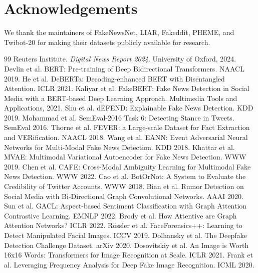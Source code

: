 \documentclass[11pt,a4paper]{article}
\begin{document}
\section*{Acknowledgements}
We thank the maintainers of FakeNewsNet, LIAR, Fakeddit, PHEME, and
Twibot-20 for making their datasets publicly available for research.




\begin{thebibliography}{99}
 Reuters Institute. \textit{Digital News Report 2024}. University of Oxford, 2024.
 Devlin et al. BERT: Pre-training of Deep Bidirectional Transformers. NAACL 2019.
 He et al. DeBERTa: Decoding-enhanced BERT with Disentangled Attention. ICLR 2021.
 Kaliyar et al. FakeBERT: Fake News Detection in Social Media with a BERT-based Deep Learning Approach. Multimedia Tools and Applications, 2021.
 Shu et al. dEFEND: Explainable Fake News Detection. KDD 2019.
 Mohammad et al. SemEval-2016 Task 6: Detecting Stance in Tweets. SemEval 2016.
 Thorne et al. FEVER: a Large-scale Dataset for Fact Extraction and VERification. NAACL 2018.
 Wang et al. EANN: Event Adversarial Neural Networks for Multi-Modal Fake News Detection. KDD 2018.
 Khattar et al. MVAE: Multimodal Variational Autoencoder for Fake News Detection. WWW 2019.
 Chen et al. CAFE: Cross-Modal Ambiguity Learning for Multimodal Fake News Detection. WWW 2022.
 Cao et al. BotOrNot: A System to Evaluate the Credibility of Twitter Accounts. WWW 2018.
 Bian et al. Rumor Detection on Social Media with Bi-Directional Graph Convolutional Networks. AAAI 2020.
 Sun et al. GACL: Aspect-based Sentiment Classification with Graph Attention Contrastive Learning. EMNLP 2022.
 Brody et al. How Attentive are Graph Attention Networks? ICLR 2022.
 Rössler et al. FaceForensics++: Learning to Detect Manipulated Facial Images. ICCV 2019.
 Dolhansky et al. The Deepfake Detection Challenge Dataset. arXiv 2020.
 Dosovitskiy et al. An Image is Worth 16x16 Words: Transformers for Image Recognition at Scale. ICLR 2021.
 Frank et al. Leveraging Frequency Analysis for Deep Fake Image Recognition. ICML 2020.
\end{thebibliography}
\end{document}
